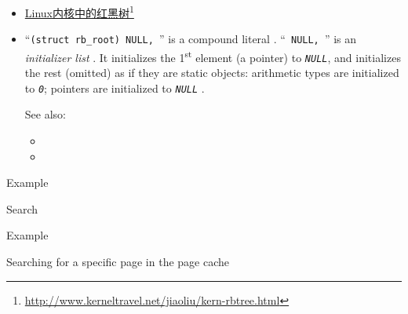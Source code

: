 \begin{itemize}
\item \href{http://www.kerneltravel.net/jiaoliu/kern-rbtree.html}{Linux内核中的红黑树}\footnote{\url{http://www.kerneltravel.net/jiaoliu/kern-rbtree.html}}
\item ``\texttt{(struct rb_root){ NULL, }}'' is a compound literal
  . ``\texttt{{ NULL, }}'' is an \emph{initializer
    list} . It initializes the
  1\textsuperscript{st} element (a pointer) to \emph{\texttt{NULL}}, and initializes the rest
  (omitted) as if they are static objects: arithmetic types are initialized to \emph{\texttt{0}};
  pointers are initialized to \emph{\texttt{NULL}} .

  See also:
  \begin{itemize}
  \item {}
  \item {}
  \end{itemize}
\end{itemize}

\begin{frame}{Example}
  \begin{center}
  \end{center}
  \begin{block}{Search}
    \begin{center}
    \end{center}
  \end{block}
\end{frame}

\begin{frame}{Example}
  \begin{block}{Searching for a specific page in the page cache}
    \begin{center}
    \end{center}
  \end{block}
\end{frame}

